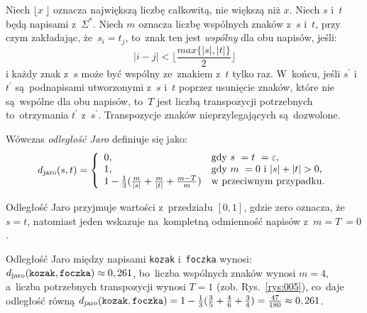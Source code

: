\documentclass{praca1}
\begin{document}
\begin{definition}
Niech $\lfloor x~\rfloor$ oznacza największą liczbę całkowitą, nie większą niż $x$. Niech $s$ i~$t$ będą napisami z~$\Sigma^*$. Niech $m$ oznacza liczbę wspólnych znaków z~$s$ i~$t$, przy czym zakładając, że~$s_i = t_j$, to~znak ten jest \emph{wspólny} dla obu napisów, jeśli:
\begin{equation*}
|i -j| < \Bigg\lfloor\frac{max\{|s|, |t|\}}{2}\Bigg\rfloor
\end{equation*}
i każdy znak z~$s$ może być wspólny ze~znakiem z~$t$ tylko raz. W~końcu, jeśli $s^\prime$ i~$t^\prime$ są~podnapisami utworzonymi z~$s$ i~$t$ poprzez usunięcie znaków, które nie są~wspólne dla obu napisów, to~$T$ jest liczbą transpozycji potrzebnych to~otrzymania $t^\prime$ z~$s^\prime$. Transpozycje znaków nieprzylegających są~dozwolone.

Wówczas \emph{odległość Jaro} definiuje się jako:
\begin{equation}
\label{eq:011}
d_{\mathrm{jaro}}(s,t) = \left\{
\begin{array}{l l}     
    0, & \text{gdy } s~= t~= \varepsilon, \\
    1, & \text{gdy } m~= 0 \text{ i~} |s| + |t| > 0, \\
    1 - \frac{1}{3} (\frac{m}{|s|} + \frac{m}{|t|} + \frac{m - T}{m}) & \text{w przeciwnym przypadku}.
\end{array}\right.
\end{equation}
\end{definition}

Odległość Jaro przyjmuje wartości z~przedziału $[0,1]$, gdzie zero oznacza, że~$s = t$, natomiast jeden wskazuje na~kompletną odmienność napisów z~$m = T~= 0$.

\begin{example}
Odległość Jaro między napisami \verb|kozak| i~\verb|foczka| wynosi: $d_{\mathrm{jaro}}(\verb|kozak|, \verb|foczka|)  \approx 0,261$, bo~liczba wspólnych znaków wynosi $m = 4$, a~liczba potrzebnych transpozycji wynosi $T = 1$ (zob. Rys.~\ref{rys:005}), co~daje odległość równą $d_{\mathrm{jaro}}(\verb|kozak|, \verb|foczka|) = 1 - \frac{1}{3}(\frac{3}{5} + \frac{4}{6} + \frac{3}{4}) = \frac{47}{180} \approx 0,261$.
\end{example}
\end{document}
